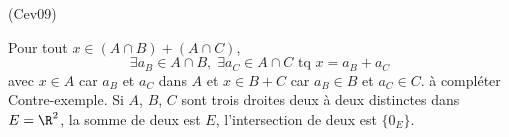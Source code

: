 \begin{tiny}(Cev09)\end{tiny} Pour tout $x \in (A\cap B) + (A\cap C)$, 
\[
\exists a_B\in A \cap B,\; \exists a_C \in A \cap C \text{ tq } x = a_B + a_C
\]
avec $x\in A$ car $a_B$ et $a_C$ dans $A$ et $x\in B + C$ car $a_B \in B$ et $a_C \in C$.\newline
à compléter\newline
Contre-exemple. Si $A$, $B$, $C$ sont trois droites deux à deux distinctes dans $E=\R^2$, la somme de deux est $E$, l'intersection de deux est $\{0_E\}$. 